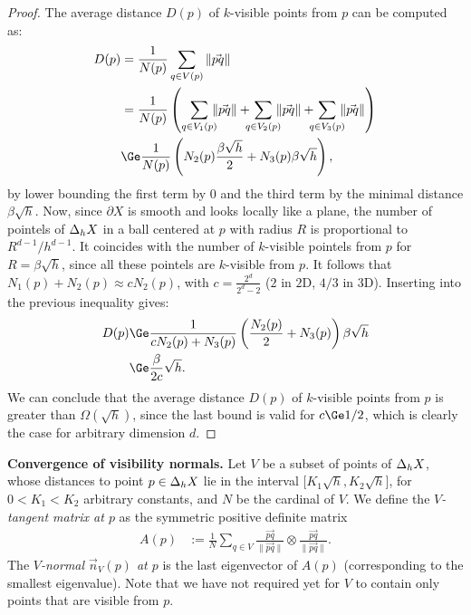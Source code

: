 \begin{proof}
    The average distance $D(p)$ of $k$-visible points from $p$ can be computed as:
    \begin{align*}
        D(p) & = \frac{1}{N(p)} \sum_{q \in V(p)} \|\vec{pq}\| \\
        & =\frac{1}{N(p)}  \left( \sum_{q \in V_1(p)} \hspace{-2mm}\|\vec{pq}\|
                               + \hspace{-2mm} \sum_{q \in V_2(p)} \hspace{-2mm}\|\vec{pq}\| + \hspace{-2mm} \sum_{q \in V_3(p)} \hspace{-2mm} \|\vec{pq}\|
        \right)\\
        & \Ge \frac{1}{N(p)} \left( N_2(p) \frac{\beta\sqrt{h}}{2} + N_3(p) \beta\sqrt{h} \right),
    \end{align*}
    by lower bounding the first term by $0$ and the third term by the
    minimal distance $\beta\sqrt{h}$. Now, since $\partial X$ is smooth
    and looks locally like a plane, the number of pointels of
    $\Delta_{h} {X}$ in a ball centered at $p$ with radius $R$ is
    proportional to $R^{d-1} / h^{d-1}$. It coincides with the number of
    $k$-visible pointels from $p$ for $R = \beta \sqrt{h}$, since all
    these pointels are $k$-visible from $p$. It follows that
    $N_1(p)+N_2(p) \approx c N_2(p)$, with $c=\frac{2^{d}}{2^d-2}$ ($2$ in
    $2$D, $4/3$ in $3$D). Inserting into the previous inequality gives:
    \begin{align*}
        D(p) & \Ge \frac{1}{c
        N_2(p)+N_3(p)} \left(\frac{N_2(p)}{2}+N_3(p) \right) \beta\sqrt{h}\\
        & \Ge \frac{\beta}{2c}\sqrt{h}.
    \end{align*}
    We can conclude that the average distance $D(p)$ of $k$-visible
    points from $p$ is greater than $\Omega(\sqrt{h})$, since the last
    bound is valid for $c \Ge 1/2$, which is clearly the case for
    arbitrary dimension $d$.
\end{proof}

\textbf{Convergence of visibility normals.}  Let $V$ be a subset of
points of $\Delta_{h} {X}$, whose distances to point $p \in \Delta_{h} {X}$ lie in the
interval $\lbrack K_1 \sqrt{h}, K_2 \sqrt{h} \rbrack$, for $0< K_1
<K_2$ arbitrary constants, and $N$ be the cardinal of $V$. We define
the \emph{$V$-tangent matrix at $p$} as the symmetric positive definite
matrix
\begin{align*}
    A(p) & := \frac{1}{N}\sum_{q \in V} \frac{\vec{pq}}{\| \vec{pq} \|}
    \otimes \frac{\vec{pq}}{\| \vec{pq} \|}.
\end{align*}
The \emph{$V$-normal $\vec{n}_V(p)$ at $p$} is the last eigenvector of $A(p)$
(corresponding to the smallest eigenvalue). Note that we have not
required yet for $V$ to contain only points that are visible from $p$.

